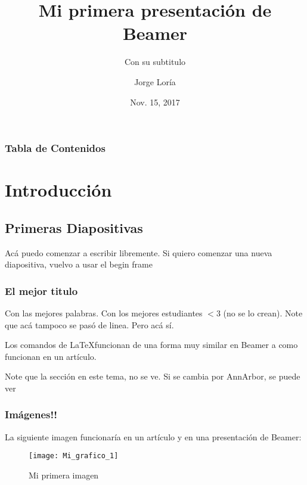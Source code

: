 \documentclass{beamer}
\title{Mi primera presentaci\'on de Beamer} %
\author{Jorge Lor\'ia}
\date{Nov. 15, 2017}
\subtitle{Con su subtitulo}
\institute[UCR]{Universidad de Costa Rica}
\begin{document}
\begin{frame}
\titlepage
\end{frame}


\begin{frame}
\frametitle{Tabla de Contenidos}
\tableofcontents
\end{frame}



\section{Introducci\'on}

\subsection{Primeras Diapositivas}


\begin{frame}

Ac\'a puedo comenzar a escribir libremente. Si quiero comenzar una nueva diapositiva, vuelvo a usar el begin frame
\end{frame}

\begin{frame}
\frametitle{El mejor titulo} %
Con las mejores palabras.
Con los mejores estudiantes $<3$ (no se lo crean). Note que ac\'a tampoco se pas\'o de linea. \newline Pero ac\'a s\'i. 

Los comandos de \LaTeX funcionan de una forma muy similar en Beamer a como funcionan en un art\'iculo.

Note que la secci\'on en este tema, no se ve. Si se cambia por AnnArbor, se puede ver 
\end{frame}


\begin{frame}
\frametitle{Im\'agenes!!}
La siguiente imagen funcionar\'ia en un art\'iculo y en una presentaci\'on de Beamer:
\begin{figure}
	\texttt{[image: Mi\_grafico\_1]}
	\caption{Mi primera imagen}
\end{figure}
\end{frame}
\end{document}
